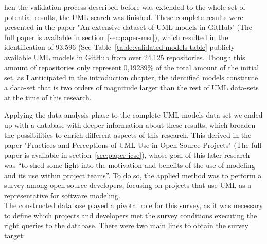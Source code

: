 \documentclass[a4paper, 12pt]{book}
\begin{document}
hen the validation process described before was extended to the whole set of potential results, the UML search was finished.
These complete results were presented in the paper "An extensive dataset of UML models in GitHub" (The full paper is available in section~\ref{sec:paper-msr}),
which resulted in the identification of 93.596 (See Table~\ref{table:validated-models-table} publicly available UML models
in GitHub from over 24.125 repositories. Though this amount of repositories only represent 0,19239\% of the total amount of the initial set,
as I anticipated in the introduction chapter, the identified models constitute a data-set that is two orders of magnitude larger than the
rest of UML data-sets at the time of this research.\par
Applying the data-analysis phase to the complete UML models data-set we ended up with a database with deeper information about these results,
which broaden the possibilities to enrich different aspects of this research. This derived in the paper "Practices and Perceptions of UML Use
in Open Source Projects" (The full paper is available in section~\ref{sec:paper-icse}), whose goal of this later research was ``to shed some
light into the motivation and benefits of the use of modeling and its use within project teams''. To do so, the applied method was to
perform a survey among open source developers, focusing on projects that use UML as a representative for software modeling.\\
The constructed database played a pivotal role for this survey, as it was necessary to define which projects and developers met the
survey conditions executing the right queries to the database. There were two main lines to obtain the survey target:
\end{document}
